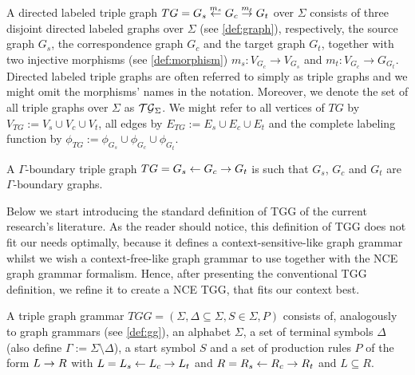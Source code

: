 \documentclass[]{report}
\begin{document}
\begin{definition}
	A directed labeled triple graph $TG = G_s \overset{m_s}{\leftarrow} G_c \overset{m_t}{\rightarrow} G_t$ over $\Sigma$ consists of three disjoint directed labeled graphs over $\Sigma$ (see \ref{def:graph}), respectively, the source graph $G_s$, the correspondence graph $G_c$ and the target graph $G_t$, together with two injective morphisms (see \ref{def:morphism}) $m_s: V_{G_c} \to V_{G_s}$ and $m_t : V_{G_c} \to G_{G_t}$. Directed labeled triple graphs are often referred to simply as triple graphs and we might omit the morphisms' names in the notation. Moreover, we denote the set of all triple graphs over $\Sigma$ as $\mathcal{TG}_{\Sigma}$. We might refer to all vertices of $TG$ by $V_{TG}:= V_s \cup V_c \cup V_t$, all edges by $E_{TG}:= E_s \cup E_c \cup E_t$ and the complete labeling function by $\phi_{TG}:= \phi_{G_s} \cup \phi_{G_c} \cup \phi_{G_t}$.
\end{definition}

\begin{definition}
	A $\Gamma\text{-boundary}$ triple graph $TG = G_s \overset{}{\leftarrow} G_c \overset{}{\rightarrow} G_t$ is such that $G_s$, $G_c$ and $G_t$ are $\Gamma\text{-boundary}$ graphs.
\end{definition}


Below we start introducing the standard definition of TGG of the current research's literature. As the reader should notice, this definition of TGG does not fit our needs optimally, because it defines a context-sensitive-like graph grammar whilst we wish a context-free-like graph grammar to use together with the NCE graph grammar formalism. Hence, after presenting the conventional TGG definition, we refine it to create a NCE TGG, that fits our context best.

\begin{definition}
	A triple graph grammar $TGG = (\Sigma, \Delta \subseteq \Sigma, S \in \Sigma, P)$ consists of, analogously to graph grammars (see \ref{def:gg}), an alphabet $\Sigma$, a set of terminal symbols $\Delta$ (also define $\Gamma := \Sigma \setminus \Delta$), a start symbol $S$ and a set of production rules $P$ of the form $L \to R$ with $L = L_s \overset{}{\leftarrow} L_c \overset{}{\rightarrow} L_t$ and $R = R_s \overset{}{\leftarrow} R_c \overset{}{\rightarrow} R_t$ and $L \subseteq R.$
\end{definition}

\end{document}
